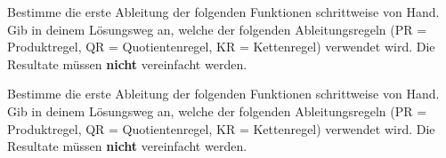 \documentclass[11pt]{exam}
\begin{document}
\begin{questions}


\noaddpoints
\question[\totalpoints]
\addpoints
Bestimme die erste Ableitung der folgenden Funktionen schrittweise von Hand. Gib in deinem Lösungsweg an, welche der folgenden Ableitungsregeln (PR = Produktregel, QR = Quotientenregel, KR = Kettenregel) verwendet wird. Die Resultate müssen \textbf{nicht} vereinfacht werden.


\noaddpoints
\question[\totalpoints]
\addpoints
Bestimme die erste Ableitung der folgenden Funktionen schrittweise von Hand. Gib in deinem Lösungsweg an, welche der folgenden Ableitungsregeln (PR = Produktregel, QR = Quotientenregel, KR = Kettenregel) verwendet wird. Die Resultate müssen \textbf{nicht} vereinfacht werden.
\begin{parts}

\end{parts}
\end{questions}
\end{document}

